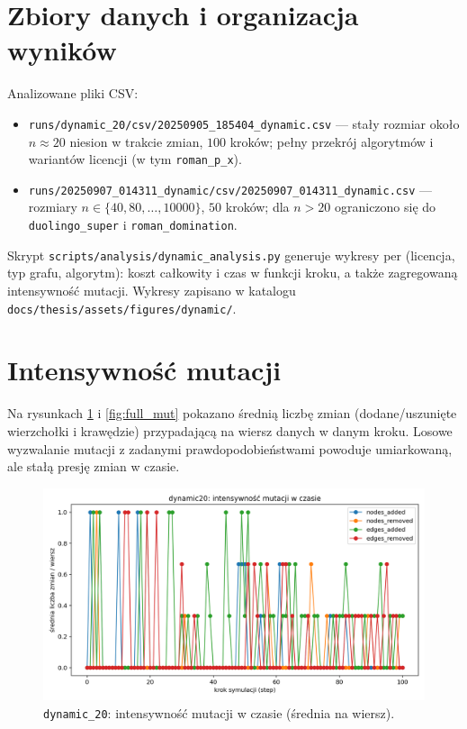 \section{Zbiory danych i organizacja wyników}

Analizowane pliki CSV:
\begin{itemize}
  \item \texttt{runs/dynamic\_20/csv/20250905\_185404\_dynamic.csv} — stały rozmiar około $n\approx20$ niesion w trakcie zmian, $100$ kroków; pełny przekrój algorytmów i wariantów licencji (w tym \texttt{roman\_p\_x}).
  \item \texttt{runs/20250907\_014311\_dynamic/csv/20250907\_014311\_dynamic.csv} — rozmiary $n\in\{40,80,\dots,10000\}$, $50$ kroków; dla $n>20$ ograniczono się do \texttt{duolingo\_super} i \texttt{roman\_domination}.
\end{itemize}
Skrypt \texttt{scripts/analysis/dynamic\_analysis.py} generuje wykresy per (licencja, typ grafu, algorytm): koszt całkowity i czas w funkcji kroku, a także zagregowaną intensywność mutacji. Wykresy zapisano w katalogu \texttt{docs/thesis/assets/figures/dynamic/}.

\section{Intensywność mutacji}

Na rysunkach \ref{fig:dyn20_mut} i \ref{fig:full_mut} pokazano średnią liczbę zmian (dodane/uszunięte wierzchołki i krawędzie) przypadającą na wiersz danych w danym kroku. Losowe wyzwalanie mutacji z zadanymi prawdopodobieństwami powoduje umiarkowaną, ale stałą presję zmian w czasie.

\begin{figure}[H]
  \centering
  \includegraphics[width=0.75\linewidth]{assets/figures/dynamic/dynamic20_mutation_intensity.png}
  \caption{\texttt{dynamic\_20}: intensywność mutacji w czasie (średnia na wiersz).}
  \label{fig:dyn20_mut}
\end{figure}


